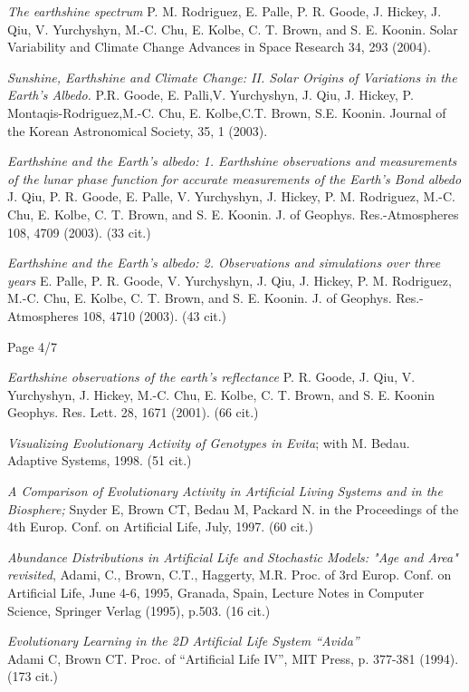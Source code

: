 \documentclass[margin,line]{resume}
\begin{document}
\begin{resume}
{\em The earthshine spectrum}
P. M. Rodriguez, E. Palle, P. R. Goode, J. Hickey, J. Qiu, V. Yurchyshyn, M.-C. Chu, E. Kolbe, C. T. Brown, and S. E. Koonin.
Solar Variability and Climate Change Advances in Space Research 34, 293 (2004).

{\em Sunshine, Earthshine and Climate Change: II. Solar Origins of Variations in the Earth's Albedo.}  P.R. Goode, E. Palli,V. Yurchyshyn, J. Qiu,
 J. Hickey, P. Montaqis-Rodriguez,M.-C. Chu,
 E. Kolbe,C.T. Brown, S.E. Koonin.
Journal of the Korean Astronomical Society, 35, 1 (2003).

{\em Earthshine and the Earth's albedo: 1. Earthshine observations and measurements of the lunar phase function for accurate measurements of the Earth's Bond albedo}
J. Qiu, P. R. Goode, E. Palle, V. Yurchyshyn, J. Hickey, P. M. Rodriguez, M.-C. Chu, E. Kolbe, C. T. Brown, and S. E. Koonin.
J. of Geophys. Res.-Atmospheres 108, 4709 (2003).  (33 cit.)

{\em Earthshine and the Earth's albedo: 2. Observations and simulations over three years}
 E. Palle, P. R. Goode, V. Yurchyshyn, J. Qiu, J. Hickey, P. M. Rodriguez, M.-C. Chu, E. Kolbe, C. T. Brown, and S. E. Koonin.
J. of Geophys. Res.-Atmospheres 108, 4710 (2003). (43 cit.)

\vspace{1cm}
{\centerline {Page 4/7}}

\newpage


{\em Earthshine observations of the earth's reflectance}
P. R. Goode, J. Qiu, V. Yurchyshyn, J. Hickey, M.-C. Chu, E. Kolbe, C. T. Brown, and S. E. Koonin
Geophys. Res. Lett. 28, 1671 (2001). (66 cit.)

{\em Visualizing Evolutionary Activity of Genotypes in Evita};
with M. Bedau.  Adaptive Systems, 1998. (51 cit.)

{\em A Comparison of Evolutionary Activity in Artificial Living Systems and in the 
	Biosphere;} Snyder E, Brown CT, Bedau M, Packard N.
in the Proceedings of the 4th Europ. Conf. on 
Artificial Life, July, 1997.  (60 cit.)

{\em Abundance Distributions in Artificial Life and Stochastic Models: "Age and
Area" revisited}, Adami, C., Brown, C.T., Haggerty, M.R.
Proc. of 3rd Europ. Conf. on Artificial Life, June 4-6, 1995,
Granada, Spain, Lecture Notes in Computer Science, Springer Verlag (1995),
p.503. (16 cit.)

{\em Evolutionary Learning in the 2D Artificial Life System ``Avida''}\\
Adami C, Brown CT. Proc. of ``Artificial Life IV'', MIT Press, p. 377-381
(1994).  (173 cit.)


\end{resume}
\end{document}
